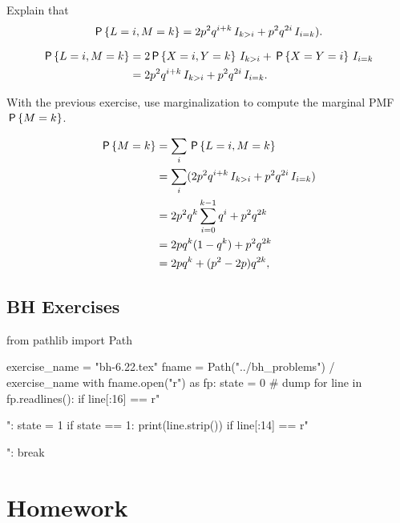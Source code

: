 \begin{exercise}\label{ex:2}
Explain that
\begin{equation*}
\P{L=i, M=k} = 2p^{2}q^{i+k}\1{k>i}+ p^{2}q^{2i}\1{i=k}).
\end{equation*}
\begin{solution}
  \begin{align*}
\P{L=i, M=k}
&= 2\P{X=i, Y=k}\1{k>i} + \P{X=Y=i}\1{i=k} \\
&= 2p^{2}q^{i+k}\1{k>i}+ p^{2}q^{2i}\1{i=k}.
  \end{align*}
\end{solution}
\end{exercise}

\begin{exercise}
With the previous exercise, use marginalization to compute the marginal PMF $\P{M=k}$.
\begin{solution}
  \begin{align*}
\P{M=k}
&= \sum_{i} \P{L=i, M=k} \\
 &= \sum_{i} (2p^{2}q^{i+k}\1{k>i}+ p^{2}q^{2i}\1{i=k}) \\
 &= 2p^2q^k\sum_{i=0}^{k-1} q^{i}+ p^{2}q^{2k} \\
 &= 2pq^k (1-q^{k})+ p^{2}q^{2k} \\
 &= 2pq^k + (p^{2}-2p) q^{2k},
  \end{align*}
\end{solution}
\end{exercise}


\subsection{BH Exercises}
\label{sec:bh-exercises}

\begin{pycode}
from pathlib import Path

exercise_name = "bh-6.22.tex"
fname = Path("../bh_problems") / exercise_name
with fname.open("r") as fp:
    state = 0  # dump
    for line in fp.readlines():
        if line[:16] == r"\begin{exercise}":
            state = 1
        if state == 1:
            print(line.strip())
        if line[:14] == r"\end{exercise}":
            break
\end{pycode}



\section{Homework}
\label{sec:homework}

